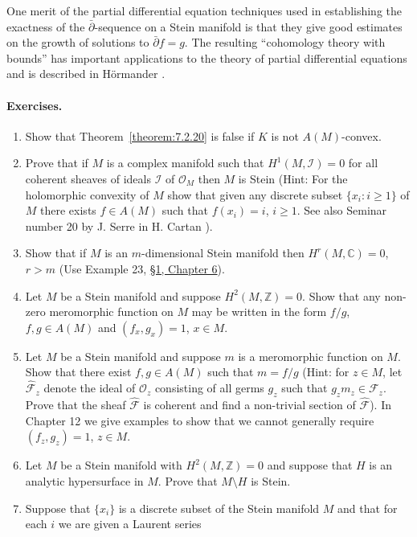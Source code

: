One merit of the partial differential equation techniques used in establishing the exactness of the $\bar\partial$-sequence on a Stein manifold is that they give good estimates on the growth of solutions to $\bar\partial f=g$. The resulting ``cohomology theory with bounds'' has important applications to the theory of partial differential equations and is described in H\"ormander \cite{bib:II:hormander-l:1}.
\paragraph{Exercises.}
\begin{enumerate}[label=\arabic*.]
\item Show that Theorem~\ref{theorem:7.2.20} is false if $K$ is not $A(M)$-convex.
\item Prove that if $M$ is a complex manifold such that $H^1(M,\mathcal I)=0$ for all coherent sheaves of ideals $\mathcal I$ of $\mathcal O_M$ then $M$ is Stein (Hint: For the holomorphic convexity of $M$ show that given any discrete subset $\{x_i:i\geq1\}$ of $M$ there exists $f\in A(M)$ such that $f(x_i)=i$, $i\geq1$. See also Seminar number 20 by J. Serre in H. Cartan \cite{bib:II:cartan-h:2}).
\item Show that if $M$ is an $m$-dimensional Stein manifold then $H^r(M,\mathbb C)=0$, $r>m$ (Use Example 23, \hyperref[sec:6:1]{\S1, Chapter 6}).
\item Let $M$ be a Stein manifold and suppose $H^2(M,\mathbb Z)=0$. Show that any non-zero meromorphic function on $M$ may be written in the form $f/g$, $f,g\in A(M)$ and $(f_x,g_x)=1$, $x\in M$.
\item Let $M$ be a Stein manifold and suppose $m$ is a meromorphic function on $M$. Show that there exist $f,g\in A(M)$ such that $m=f/g$ (Hint: for $z\in M$, let $\widehat{\mathcal F}_z$ denote the ideal of $\mathcal O_z$ consisting of all germs $g_z$ such that $g_zm_z\in\mathcal F_z$. Prove that the sheaf $\widehat{\mathcal F}$ is coherent and find a non-trivial section of $\widehat{\mathcal F}$). In Chapter 12 we give examples to show that we cannot generally require $(f_z,g_z)=1$, $z\in M$.
\item Let $M$ be a Stein manifold with $H^2(M,\mathbb Z)=0$ and suppose that $H$ is an analytic hypersurface in $M$. Prove that $M\setminus H$ is Stein.
\item Suppose that $\{x_i\}$ is a discrete subset of the Stein manifold $M$ and that for each $i$ we are given a Laurent series
\[
\]
\end{enumerate}
